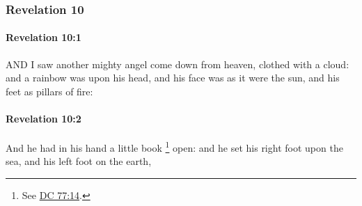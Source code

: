 	\subsubsection{Revelation 10} %
		\label{REVELATIONNT-10}
		
		\paragraph{Revelation 10:1} %
			\label{REVELATIONNT-10-1}

			AND I saw another mighty angel come down from heaven, clothed with a cloud: and a rainbow was upon his head, and his face was as it were the sun, and his feet as pillars of fire:

			\begin{framed}
			\scriptsize
				\begin{compactdesc}
					\item[SBLG] 
				\end{compactdesc}
			\end{framed}

		\paragraph{Revelation 10:2} %
			\label{REVELATIONNT-10-2}

			And he had in his hand a little book%
				\footnote{%
					See \hyperref[DC77-14]{DC 77:14}.
					}
			open: and he set his right foot upon the sea, and his left foot on the earth,

